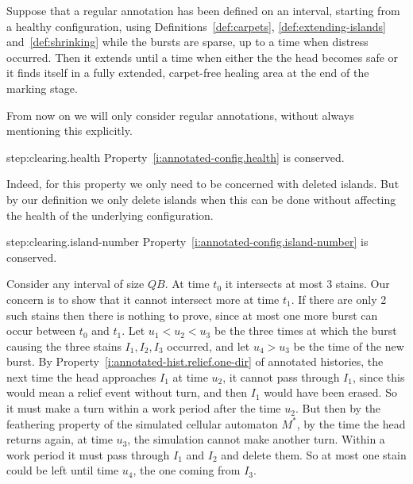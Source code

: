 \documentclass[12pt]{memoir}
\newcommand{\authnote}[3]
{\text{{ \textcolor{#3}{\( \langle\hspace{-0.2em}\langle \)\textsf{\footnotesize #1: #2}\( \rangle\hspace{-0.2em}\rangle \)}}}}
\newcommand{\authnote}[2]{}
\newcommand{\Pnote}[1]{{\authnote{P}{#1}{cyan}}}
\def\B{B}
\begin{document}
\begin{lemma}\label{lem:clearing} Suppose that a regular annotation has been defined
on an interval, starting from a healthy configuration,
using Definitions~\ref{def:carpets}, \ref{def:extending-islands} and~\ref{def:shrinking}
while the bursts are sparse, up to a time when distress occurred.
Then it extends until a time when either the the head becomes safe or it finds
itself in a fully extended, carpet-free healing area at the end of the marking stage.
\end{lemma}
From now on we will only consider regular annotations, without always mentioning
this explicitly.
\begin{Proof}
\begin{step+}{step:clearing.health}
Property~\ref{i:annotated-config.health} is conserved.
\end{step+}
\begin{prooof}
Indeed, for this property we only need to be concerned with deleted islands.
But by our definition we only delete islands when this can be done
without affecting the health of the underlying configuration.
\end{prooof} %

\begin{step+}{step:clearing.island-number}
Property~\ref{i:annotated-config.island-number} is conserved.
\end{step+}
\begin{pproof}
Consider any interval of size \( Q\B \).
At time \( t_{0} \) it intersects at most 3 stains.
Our concern is to show that it cannot intersect more at time \( t_{1} \).
If there are only 2 such stains then there is nothing to prove, since
at most one more burst can occur between \( t_{0} \) and \( t_{1} \).
Let \( u_{1}<u_{2}<u_{3} \) be the three times at which the burst
causing the three stains \( I_{1},I_{2},I_{3} \) occurred, and 
let \( u_{4}>u_{3}\) be the time of the new burst.
By Property~\ref{i:annotated-hist.relief.one-dir} of annotated histories,
the next time the head approaches \( I_{1} \) at time \( u_{2} \),
it cannot pass through \( I_{1} \),
since this would mean a relief event without turn, and then
\( I_{1} \) would have been erased.
So it must make a turn within a work period after the time \( u_{2} \).
But then by the feathering property of the simulated cellular automaton \( M^{*} \),
by the time the head returns again, at time \( u_{3} \),
the simulation cannot make another turn.
Within a work period it must pass through \( I_{1} \) and \( I_{2} \)
and delete them.
So at most one stain could be left until time \( u_{4} \), 
the one coming from \( I_{3} \).
\Pnote{Closer estimation of distances needed here.}
\end{pproof} %


\end{Proof}
\end{document}
